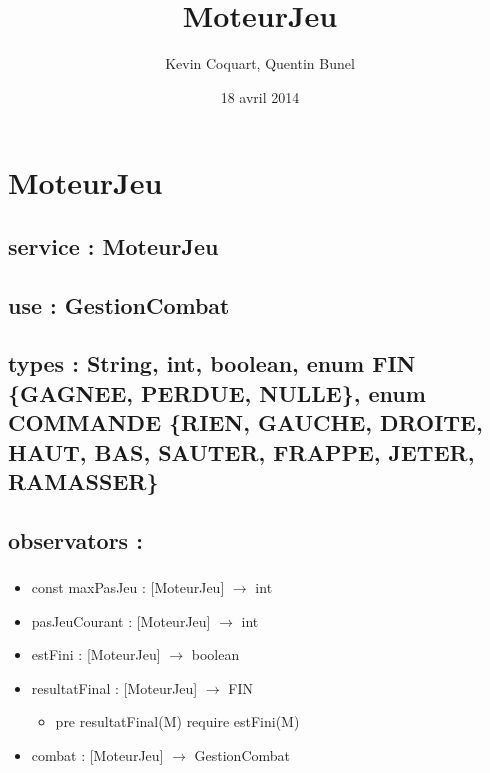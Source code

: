 \documentclass[11pt]{article}
\title{MoteurJeu}
\author{Kevin Coquart, Quentin Bunel}
\date{18 avril 2014}
\begin{document}
\maketitle

\setcounter{tocdepth}{3}
\tableofcontents
\vspace*{1cm}
\section{MoteurJeu}
\label{sec-1}

\subsection{service : MoteurJeu}
\label{sec-1.1}

\subsection{use : GestionCombat}
\label{sec-1.2}

\subsection{types : String, int, boolean, enum FIN \{GAGNEE, PERDUE, NULLE\}, enum COMMANDE \{RIEN, GAUCHE, DROITE, HAUT, BAS, SAUTER, FRAPPE, JETER, RAMASSER\}}
\label{sec-1.3}

   
\subsection{observators :}
\label{sec-1.4}

\subsubsection{}

\begin{itemize}

\item const maxPasJeu : [MoteurJeu] $\to$ int\\
\label{sec-1.4.1.1}


\item pasJeuCourant : [MoteurJeu] $\to$ int\\
\label{sec-1.4.1.2}


\item estFini : [MoteurJeu] $\to$ boolean\\
\label{sec-1.4.1.3}


\item resultatFinal : [MoteurJeu] $\to$ FIN\\
\label{sec-1.4.1.4}

\begin{itemize}

\item pre resultatFinal(M) require estFini(M)\\
\label{sec-1.4.1.4.1}

\end{itemize} %

\item combat : [MoteurJeu] $\to$ GestionCombat\\
\label{sec-1.4.1.5}


\end{itemize} %
\end{document}
